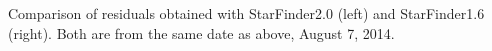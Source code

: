 Comparison of residuals obtained with StarFinder2.0 (left) and StarFinder1.6 (right). Both are from the same date as above, August 7, 2014.
  
  